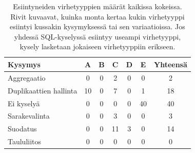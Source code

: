 \begin{table}[h]
  \centering
  \caption{Esiintyneiden virhetyyppien määrät kaikissa kokeissa. Rivit kuvaavat, kuinka monta kertaa kukin virhetyyppi esiintyi kussakin kysymyksessä tai sen variaatioissa. Jos yhdessä SQL-kyselyssä esiintyy useampi virhetyyppi, kysely lasketaan jokaiseen virhetyyppiin erikseen.}
  \label{tb:errors}
  \setlength{\tabcolsep}{4pt}
  \begin{tabular}{lcccccc}
    \toprule
    Kysymys & A & B & C & D & E & Yhteensä\\
    \midrule
    Aggregaatio & 0 & 0 & 2  & 0 & 0  & 2 \\
    Duplikaattien hallinta & 10 & 0 & 7 & 0 & 1 & 18 \\
    Ei kyselyä & 0 & 0 & 0 & 0 & 40 & 40 \\
    Sarakevalinta & 0 & 0 & 3 & 0 & 0 & 3 \\
    Suodatus & 0 & 0 & 11  & 3 & 0  & 14 \\
    Taululiitos & 0 & 0 & 0 & 0 & 0 & 0 \\
    \bottomrule
  \end{tabular}
\end{table}
